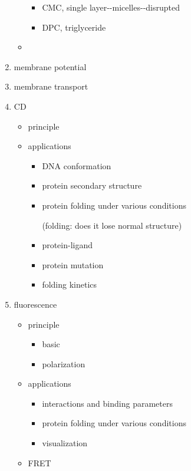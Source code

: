 \documentclass[]{article}
\begin{document}
\begin{enumerate}
\begin{itemize}
    \begin{itemize}
    \item
      CMC, single layer-\/-micelles-\/-disrupted
    \item
      DPC, triglyceride
    \end{itemize}
  \item
  \end{itemize}
\item
  membrane potential
\item
  membrane transport
\item
  CD

  \begin{itemize}
  \item
    principle
  \item
    applications

    \begin{itemize}
    \item
      DNA conformation
    \item
      protein secondary structure
    \item
      protein folding under various conditions

      (folding: does it lose normal structure)
    \item
      protein-ligand
    \item
      protein mutation
    \item
      folding kinetics
    \end{itemize}
  \end{itemize}
\item
  fluorescence

  \begin{itemize}
  \item
    principle

    \begin{itemize}
    \item
      basic
    \item
      polarization
    \end{itemize}
  \item
    applications

    \begin{itemize}
    \item
      interactions and binding parameters
    \item
      protein folding under various conditions
    \item
      visualization
    \end{itemize}
  \item
    FRET


\end{itemize}
\end{enumerate}
\end{document}
